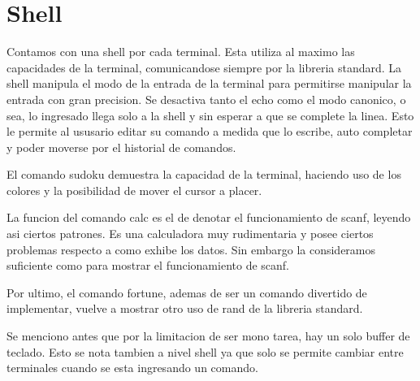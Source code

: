 \documentclass[a4paper,10pt]{article}
\begin{document}
\section{Shell}
    Contamos con una shell por cada terminal.
    Esta utiliza al maximo las capacidades de la terminal, comunicandose siempre por la libreria standard.
    La shell manipula el modo de la entrada de la terminal para permitirse manipular la entrada con gran precision.
    Se desactiva tanto el echo como el modo canonico, o sea, lo ingresado llega solo a la shell y sin esperar a que se complete la linea.
    Esto le permite al ususario editar su comando a medida que lo escribe, auto completar y poder moverse por el historial de comandos.

    El comando sudoku demuestra la capacidad de la terminal, haciendo uso de los colores y la posibilidad de mover el cursor a placer.
    
    La funcion del comando calc es el de denotar el funcionamiento de scanf, leyendo asi ciertos patrones. Es una calculadora muy rudimentaria y posee ciertos problemas respecto a como exhibe los datos. Sin embargo la consideramos suficiente como para mostrar el funcionamiento de scanf.
    
    Por ultimo, el comando fortune, ademas de ser un comando divertido de implementar, vuelve a mostrar otro uso de rand de la libreria standard.

    Se menciono antes que por la limitacion de ser mono tarea, hay un solo buffer de teclado.
    Esto se nota tambien a nivel shell ya que solo se permite cambiar entre terminales cuando se esta ingresando un comando.
\end{document}
